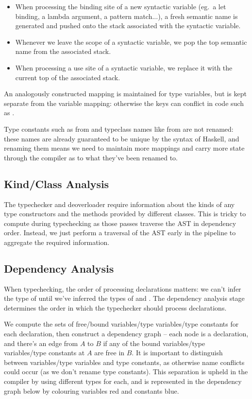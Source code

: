 \documentclass[dissertation.tex]{subfiles}
\begin{document}
{{        \begin{itemize}
        \item When processing the binding site of a new syntactic variable (eg.\ a let binding, a lambda argument, a pattern match...), a fresh semantic name is generated and pushed onto the stack associated with the syntactic variable.
        \item Whenever we leave the scope of a syntactic variable, we pop the top semantic name from the associated stack.
        \item When processing a use site of a syntactic variable, we replace it with the current top of the associated stack.
        \end{itemize}

        An analogously constructed mapping is maintained for type variables, but is kept separate from the variable mapping: otherwise the keys can conflict in code such as .

        Type constants such as  from  and typeclass names like  from  are not renamed: these names are already guaranteed to be unique by the syntax of Haskell, and renaming them means we need to maintain more mappings and carry more state through the compiler as to what they've been renamed to.
    }
    \subsection{Kind/Class Analysis}
    {
        The typechecker and deoverloader require information about the kinds of any type constructors and the methods provided by different classes. This is tricky to compute during typechecking as those passes traverse the AST in dependency order. Instead, we just perform a traversal of the AST early in the pipeline to aggregate the required information. 
    }
    \subsection{Dependency Analysis}\label{sec:dependency-analysis}
    {
        When typechecking, the order of processing declarations matters: we can't infer the type of  until we've inferred the types of  and . The dependency analysis stage determines the order in which the typechecker should process declarations. 

        We compute the sets of free/bound variables/type variables/type constants for each declaration, then construct a dependency graph -- each node is a declaration, and there's an edge from \(A\) to \(B\) if any of the bound variables/type variables/type constants at \(A\) are free in \(B\). It is important to distinguish between variables/type variables and type constants, as otherwise name conflicts could occur (as we don't rename type constants). This separation is upheld in the compiler by using different types for each, and is represented in the dependency graph below by colouring variables red and constants blue.

}}
\end{document}

